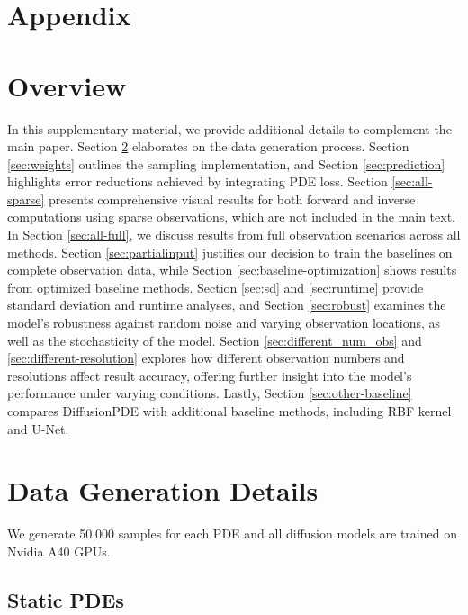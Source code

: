 \appendix
\section*{Appendix}
\vspace{-0.5em}
\section{Overview}
\vspace{-0.3em}

In this supplementary material, we provide additional details to complement the main paper. Section \ref{sec:data_generation} elaborates on the data generation process. Section \ref{sec:weights} outlines the sampling implementation, and Section \ref{sec:prediction} highlights error reductions achieved by integrating PDE loss. Section \ref{sec:all-sparse} presents comprehensive visual results for both forward and inverse computations using sparse observations, which are not included in the main text. In Section \ref{sec:all-full}, we discuss results from full observation scenarios across all methods. Section \ref{sec:partialinput} justifies our decision to train the baselines on complete observation data, while Section \ref{sec:baseline-optimization} shows results from optimized baseline methods. Section \ref{sec:sd} and \ref{sec:runtime} provide standard deviation and runtime analyses, and Section \ref{sec:robust} examines the model's robustness against random noise and varying observation locations, as well as the stochasticity of the model. Section \ref{sec:different_num_obs} and \ref{sec:different-resolution}  explores how different observation numbers and resolutions affect result accuracy, offering further insight into the model's performance under varying conditions. Lastly, Section \ref{sec:other-baseline} compares DiffusionPDE with additional baseline methods, including RBF kernel and U-Net.

 
\vspace{-0.5em}
\section{Data Generation Details}\label{sec:data_generation}
\vspace{-0.3em}

We generate 50,000 samples for each PDE and all diffusion models are trained on Nvidia A40 GPUs.

\vspace{-0.2em}
\subsection{Static PDEs}

